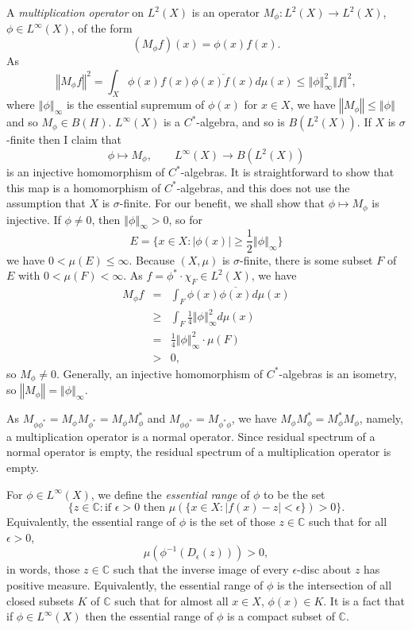 \documentclass{article}
\newcommand{\norm}[1]{\left\Vert #1 \right\Vert}
\begin{document}
A {\em multiplication operator} on $L^2(X)$ is an operator $M_\phi:L^2(X) \to L^2(X)$, $\phi \in L^\infty(X)$, of the form
 \[
 (M_\phi f)(x)=\phi(x) f(x).
 \]
 As 
 \[
 \norm{M_\phi f}^2=\int_X \phi(x) f(x) \overline{\phi(x) f(x)} d\mu(x) \leq \norm{\phi}_\infty^2 \norm{f}^2,
 \]
 where $\norm{\phi}_\infty$ is the essential supremum of $\phi(x)$ for $x \in X$, we have $\norm{M_\phi} \leq \norm{\phi}$ and so $M_\phi \in B(H)$. $L^\infty(X)$ is a $C^*$-algebra, and so is
 $B(L^2(X))$. If $X$ is $\sigma$-finite then I claim that
 \[
 \phi \mapsto M_\phi, \qquad L^\infty(X) \to B(L^2(X))
 \]
 is an injective homomorphism of $C^*$-algebras. It is straightforward to show that this map is a homomorphism of $C^*$-algebras, and this 
 does not use the assumption that $X$ is $\sigma$-finite.
For our benefit, we shall show that
 $\phi \mapsto M_\phi$ is injective. 
 If $\phi \neq 0$, then
$\norm{\phi}_\infty>0$, so for  
\[
E=\{x \in X:|\phi(x)| \geq \frac{1}{2} \norm{\phi}_\infty\}
\]
 we have $0 < \mu(E) \leq \infty$. Because $(X,\mu)$ is $\sigma$-finite, there is
some subset $F$ of $E$ with $0<\mu(F)<\infty$. As $f=\phi^* \cdot \chi_F \in L^2(X)$, we have
\begin{eqnarray*}
M_\phi f &=&\int_F \phi(x) \overline{\phi(x)} d\mu(x)\\
&\geq&\int_F \frac{1}{4} \norm{\phi}_\infty^2  d\mu(x)\\
&=& \frac{1}{4} \norm{\phi}_\infty^2 \cdot \mu(F)\\
&>&0,
\end{eqnarray*}
so $M_\phi \neq 0$. 
 Generally, an injective homomorphism of $C^*$-algebras is an isometry, so $\norm{M_\phi}=\norm{\phi}_\infty$. 

As $M_{\phi \phi^*}=M_\phi M_{\phi^*}=M_\phi M_\phi^*$ and $M_{\phi \phi^*}=M_{\phi^* \phi}$, we have $M_\phi M_\phi^*=M_\phi^* M_\phi$, namely,
 a multiplication operator is a normal operator.
Since residual spectrum of a normal operator is empty, the 
residual spectrum of a multiplication operator is empty.


For $\phi \in L^\infty(X)$, we define the {\em essential range} of $\phi$ to be the set 
\[
\Big\{z \in \mathbb{C}:\textrm{if $\epsilon>0$ then $\mu(\{x \in X:|f(x)-z|<\epsilon\})>0$}\Big\}.
\]
Equivalently, the essential range of $\phi$ is the set of those $z \in \mathbb{C}$ such that for all $\epsilon>0$,
\[
\mu(\phi^{-1}(D_\epsilon(z)))>0,
\]
in words, those $z \in \mathbb{C}$ such that the inverse image of every $\epsilon$-disc about $z$ has positive measure.
Equivalently, the essential range of $\phi$ is the intersection of all closed subsets $K$ of $\mathbb{C}$ such that for almost all $x \in X$, $\phi(x) \in K$.
It is a fact that if $\phi \in L^\infty(X)$ then the essential range of $\phi$ is a compact subset of $\mathbb{C}$.
\end{document}

